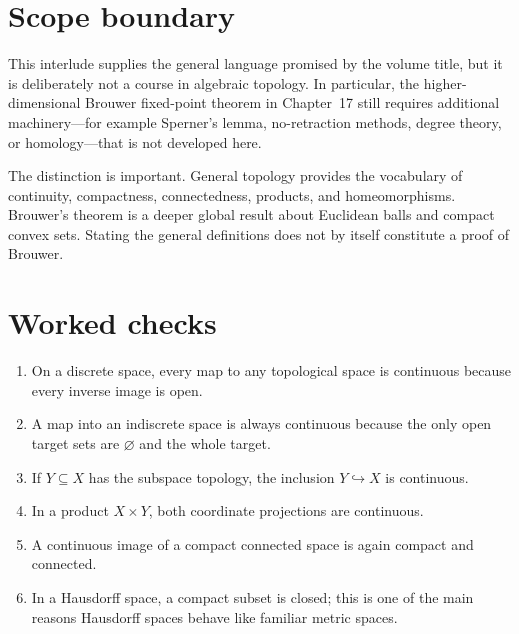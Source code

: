 \section{Scope boundary}
This interlude supplies the general language promised by the volume title, but it is deliberately not a course in algebraic topology. In particular, the higher-dimensional Brouwer fixed-point theorem in Chapter~17 still requires additional machinery---for example Sperner's lemma, no-retraction methods, degree theory, or homology---that is not developed here.

The distinction is important. General topology provides the vocabulary of continuity, compactness, connectedness, products, and homeomorphisms. Brouwer's theorem is a deeper global result about Euclidean balls and compact convex sets. Stating the general definitions does not by itself constitute a proof of Brouwer.

\section*{Worked checks}
\begin{enumerate}
\item On a discrete space, every map to any topological space is continuous because every inverse image is open.
\item A map into an indiscrete space is always continuous because the only open target sets are \(\varnothing\) and the whole target.
\item If \(Y\subseteq X\) has the subspace topology, the inclusion \(Y\hookrightarrow X\) is continuous.
\item In a product \(X\times Y\), both coordinate projections are continuous.
\item A continuous image of a compact connected space is again compact and connected.
\item In a Hausdorff space, a compact subset is closed; this is one of the main reasons Hausdorff spaces behave like familiar metric spaces.
\end{enumerate}

